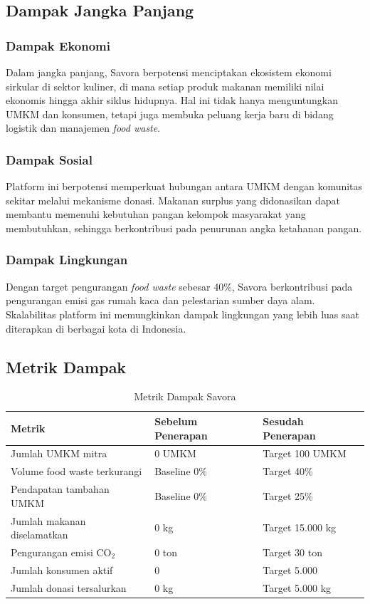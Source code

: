 \subsection{Dampak Jangka Panjang}

\subsubsection{Dampak Ekonomi}
Dalam jangka panjang, Savora berpotensi menciptakan ekosistem ekonomi sirkular di sektor kuliner, di mana setiap produk makanan memiliki nilai ekonomis hingga akhir siklus hidupnya. Hal ini tidak hanya menguntungkan UMKM dan konsumen, tetapi juga membuka peluang kerja baru di bidang logistik dan manajemen \textit{food waste}.

\subsubsection{Dampak Sosial}
Platform ini berpotensi memperkuat hubungan antara UMKM dengan komunitas sekitar melalui mekanisme donasi. Makanan surplus yang didonasikan dapat membantu memenuhi kebutuhan pangan kelompok masyarakat yang membutuhkan, sehingga berkontribusi pada penurunan angka ketahanan pangan.

\subsubsection{Dampak Lingkungan}
Dengan target pengurangan \textit{food waste} sebesar 40\%, Savora berkontribusi pada pengurangan emisi gas rumah kaca dan pelestarian sumber daya alam. Skalabilitas platform ini memungkinkan dampak lingkungan yang lebih luas saat diterapkan di berbagai kota di Indonesia.

\subsection{Metrik Dampak}

\begin{table}[H]
\centering
\caption{Metrik Dampak Savora}
\label{tab:metrik_dampak}
\begin{tabularx}{\textwidth}{|l|X|X|}
\hline
\textbf{Metrik} & \textbf{Sebelum Penerapan} & \textbf{Sesudah Penerapan} \\
\hline
Jumlah UMKM mitra & 0 UMKM & Target 100 UMKM \\
\hline
Volume food waste terkurangi & Baseline 0\% & Target 40\% \\
\hline
Pendapatan tambahan UMKM & Baseline 0\% & Target 25\% \\
\hline
Jumlah makanan diselamatkan & 0 kg & Target 15.000 kg \\
\hline
Pengurangan emisi CO$_2$ & 0 ton & Target 30 ton \\
\hline
Jumlah konsumen aktif & 0 & Target 5.000 \\
\hline
Jumlah donasi tersalurkan & 0 kg & Target 5.000 kg \\
\hline
\end{tabularx}
\end{table}
